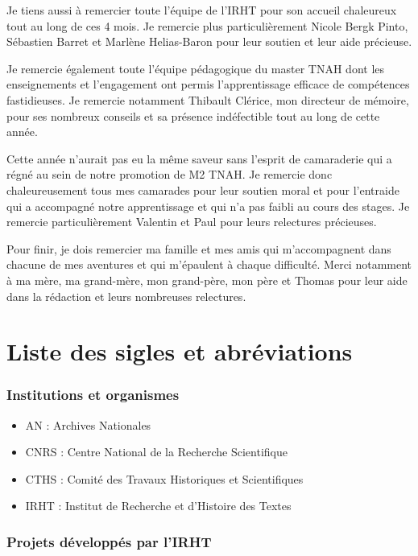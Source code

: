 \documentclass[a4paper,12pt,twoside]{book}
\begin{document}
	Je tiens aussi à remercier toute l'équipe de l'IRHT pour son accueil chaleureux tout au long de ces 4 mois. Je remercie plus particulièrement Nicole Bergk Pinto, Sébastien Barret et Marlène Helias-Baron pour leur soutien et leur aide précieuse.
	
	Je remercie également toute l'équipe pédagogique du master TNAH dont les enseignements et l'engagement ont permis l'apprentissage efficace de compétences fastidieuses. Je remercie notamment Thibault Clérice, mon directeur de mémoire, pour ses nombreux conseils et sa présence indéfectible tout au long de cette année.
	
	Cette année n'aurait pas eu la même saveur sans l'esprit de camaraderie qui a régné au sein de notre promotion de M2 TNAH. Je remercie donc chaleureusement tous mes camarades pour leur soutien moral et pour l'entraide qui a accompagné notre apprentissage et qui n'a pas faibli au cours des stages. Je remercie particulièrement Valentin et Paul pour leurs relectures précieuses.
	
	Pour finir, je dois remercier ma famille et mes amis qui m'accompagnent dans chacune de mes aventures et qui m'épaulent à chaque difficulté. Merci notamment à ma mère, ma grand-mère, mon grand-père, mon père et Thomas pour leur aide dans la rédaction et leurs nombreuses relectures.
	
	\chapter{Liste des sigles et abréviations}
	
	\subsection*{Institutions et organismes}
	
	\begin{itemize}
		\item AN : Archives Nationales
		\item CNRS : Centre National de la Recherche Scientifique
		\item CTHS : Comité des Travaux Historiques et Scientifiques
		\item IRHT : Institut de Recherche et d'Histoire des Textes
	\end{itemize}

	\subsection*{Projets développés par l'IRHT}
	
\end{document}
